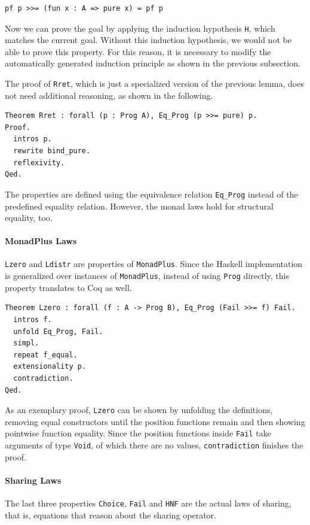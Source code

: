 \documentclass[a4paper, 11pt, fleqn, twoside, abstract=on]{scrreprt}
\newcommand{\hinl}[1]{\texttt{#1}}
\newcommand{\cinl}[1]{\texttt{#1}}
\begin{document}
\begin{verbatim}
pf p >>= (fun x : A => pure x) = pf p
\end{verbatim}

Now we can prove the goal by applying the induction hypothesis \cinl{H}, which matches the current goal.
Without this induction hypothesis, we would not be able to prove this property.
For this reason, it is necessary to modify the automatically generated induction principle as shown in the previous subsection.

The proof of \cinl{Rret}, which is just a specialized version of the previous lemma, does not need additional reasoning, as shown in the following.

\begin{verbatim}
Theorem Rret : forall (p : Prog A), Eq_Prog (p >>= pure) p.
Proof.
  intros p.
  rewrite bind_pure.
  reflexivity.
Qed.
\end{verbatim}
\noindent
The properties are defined using the equivalence relation \cinl{Eq_Prog} instead of the predefined equality relation.
However, the monad laws hold for structural equality, too.

\paragraph{MonadPlus Laws}
\cinl{Lzero} and \cinl{Ldistr} are properties of \hinl{MonadPlus}.
Since the Haskell implementation is generalized over instances of \cinl{MonadPlus}, instead of using \cinl{Prog} directly, this property translates to Coq as well.

\begin{verbatim}
Theorem Lzero : forall (f : A -> Prog B), Eq_Prog (Fail >>= f) Fail.
  intros f.
  unfold Eq_Prog, Fail.
  simpl.
  repeat f_equal.
  extensionality p.
  contradiction.
Qed.
\end{verbatim}

As an exemplary proof, \cinl{Lzero} can be shown by unfolding the definitions, removing equal constructors until the position functions remain and then showing pointwise function equality.
Since the position functions inside \cinl{Fail} take arguments of type \cinl{Void}, of which there are no values, \cinl{contradiction} finishes the proof.

\paragraph{Sharing Laws}
The last three properties \cinl{Choice}, \cinl{Fail} and \cinl{HNF} are the actual laws of sharing, that is, equations that reason about the sharing operator.
\end{document}
